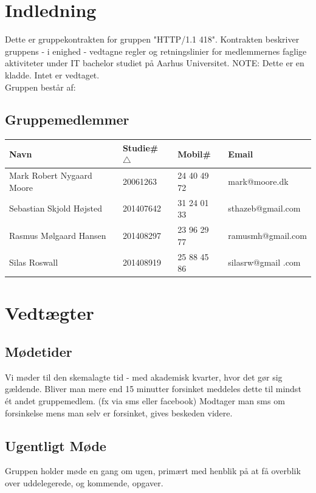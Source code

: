 \documentclass[a4paper,oneside,article]{memoir}
\date {04. februar 2015}
\begin{document}

\section{Indledning}
Dette er gruppekontrakten for gruppen "HTTP/1.1 418".
Kontrakten beskriver gruppens - i enighed - vedtagne regler og retningslinier for medlemmernes faglige aktiviteter under IT bachelor studiet på Aarhus Universitet.
NOTE: Dette er en kladde. Intet er vedtaget.\\
Gruppen består af:
\subsection{Gruppemedlemmer}
\begin{tabular}{ l | l | l | l }
    Navn & Studie\# $\triangle$ & Mobil\# & Email \\ \hline
    Mark Robert Nygaard Moore & 20061263 & 24 40 49 72 & mark@moore.dk \\ \hline
    Sebastian Skjold Højsted & 201407642 & 31 24 01 33 & sthazeb@gmail.com \\ \hline
	Rasmus Mølgaard Hansen & 201408297 & 23 96 29 77 & ramusmh@gmail.com \\ \hline
    Silas Roswall & 201408919 & 25 88 45 86 & silasrw@gmail .com
\end{tabular}
\label{subsec:medlemmer}
\section{Vedtægter}
\subsection{Mødetider}
Vi møder til den skemalagte tid - med akademisk kvarter, hvor det gør sig gældende.
Bliver man mere end 15 minutter forsinket meddeles dette til mindst ét andet gruppemedlem. (fx via sms eller facebook)
Modtager man sms om forsinkelse mens man selv er forsinket, gives beskeden videre.
\subsection{Ugentligt Møde}
Gruppen holder møde en gang om ugen, primært med henblik på at få overblik over uddelegerede, og kommende, opgaver.
\end{document}

